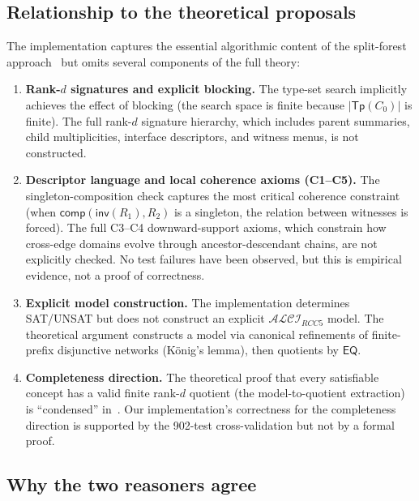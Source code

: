 \documentclass[a4paper,11pt]{article}
\theoremstyle{definition}
\newcommand{\ALCIRCC}[1]{\ensuremath{\mathcal{ALCI}_{\mathit{RCC#1}}}}
\newcommand{\EQ}{\ensuremath{\mathsf{EQ}}}
\newcommand{\inv}{\ensuremath{\mathsf{inv}}}
\newcommand{\comp}{\ensuremath{\mathsf{comp}}}
\newcommand{\Tp}{\ensuremath{\mathsf{Tp}}}
\begin{document}
\subsection{Relationship to the theoretical proposals}

The implementation captures the essential algorithmic content
of the split-forest approach~\cite{SiblingCompleted,CoverTree}
but omits several components of the full theory:

\begin{enumerate}[label=(\roman*)]
  \item \textbf{Rank-$d$ signatures and explicit blocking.}
    The type-set search implicitly achieves the effect of blocking
    (the search space is finite because $|\Tp(C_0)|$ is finite).
    The full rank-$d$ signature hierarchy, which includes parent
    summaries, child multiplicities, interface descriptors, and
    witness menus, is not constructed.

  \item \textbf{Descriptor language and local coherence axioms
    (C1--C5).}
    The singleton-composition check captures the most critical
    coherence constraint (when $\comp(\inv(R_1), R_2)$ is a
    singleton, the relation between witnesses is forced).
    The full C3--C4 downward-support axioms, which constrain how
    cross-edge domains evolve through ancestor-descendant chains,
    are not explicitly checked.  No test failures have been
    observed, but this is empirical evidence, not a proof of
    correctness.

  \item \textbf{Explicit model construction.}
    The implementation determines SAT/UNSAT but does not construct
    an explicit $\ALCIRCC{5}$ model.  The theoretical argument
    constructs a model via canonical refinements of finite-prefix
    disjunctive networks (K\"onig's lemma), then quotients by
    $\EQ$.

  \item \textbf{Completeness direction.}
    The theoretical proof that every satisfiable concept has a
    valid finite rank-$d$ quotient (the model-to-quotient
    extraction) is ``condensed'' in~\cite{SiblingCompleted}.
    Our implementation's correctness for the completeness direction
    is supported by the 902-test cross-validation but not by a
    formal proof.
\end{enumerate}

\subsection{Why the two reasoners agree}
\end{document}
